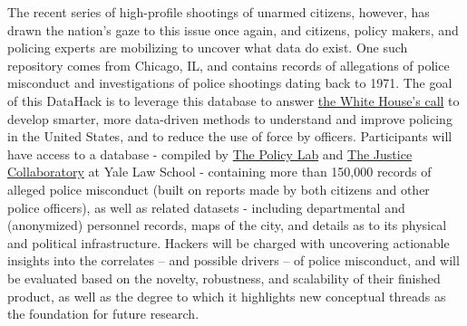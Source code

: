 \documentclass[11pt]{amsart}
\begin{document}
The recent series of high-profile shootings of unarmed citizens, however, has drawn the nation's gaze to this issue once again, and citizens, policy makers, and policing experts are mobilizing to uncover what data do exist.  One such repository comes from Chicago, IL, and contains records of allegations of police misconduct and investigations of police shootings dating back to 1971. The goal of this DataHack is to leverage this database to answer \href{https://www.whitehouse.gov/datadrivenjustice}{the White House's call} to develop smarter, more data-driven methods to understand and improve policing in the United States, and to reduce the use of force by officers.  Participants will have access to a database - compiled by \href{http://isps.yale.edu/programs/policy-lab}{The Policy Lab} and \href{https://www.law.yale.edu/centers-workshops/justice-collaboratory}{The Justice Collaboratory} at Yale Law School - containing more than 150,000 records of alleged police misconduct (built on reports made by both citizens and other police officers), as well as related datasets - including departmental and (anonymized) personnel records, maps of the city, and details as to its physical and political infrastructure. Hackers will be charged with uncovering actionable insights into the correlates -- and possible drivers -- of police misconduct, and will be evaluated based on the novelty, robustness, and scalability of their finished product, as well as the degree to which it highlights new conceptual threads as the foundation for future research. 
\end{document}
